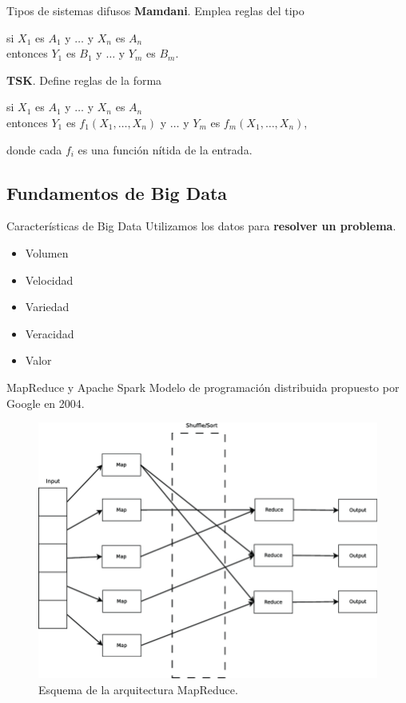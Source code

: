 \documentclass[10pt, spanish]{beamer}
\begin{document}
\begin{frame}{Tipos de sistemas difusos}
\textbf{Mamdani}. Emplea reglas del tipo
  \begin{center}
  si $X_1$ es $A_1$ y $\dots$ y $X_n$ es $A_n$\\
  entonces $Y_1$ es $B_1$ y $\dots$ y $Y_m$ es $B_m$.
\end{center}
\vspace{1em}

\textbf{TSK}. Define reglas de la forma
\begin{center}
  si $X_1$ es $A_1$ y $\dots$ y $X_n$ es $A_n$\\
  entonces $Y_1$ es $f_1(X_1, \dots, X_n)$ y $\dots$ y $Y_m$ es $f_m(X_1, \dots, X_n)$,
\end{center}
    donde cada $f_i$ es una función nítida de la entrada.

\end{frame}

\subsection{Fundamentos de Big Data}

\begin{frame}{Características de Big Data}
  Utilizamos los datos para \textbf{resolver un problema}.

\begin{itemize}
  \item Volumen
  \item Velocidad
  \item Variedad
  \item Veracidad
  \item Valor
\end{itemize}
\end{frame}

\begin{frame}{MapReduce y Apache Spark}
  Modelo de programación distribuida propuesto por Google en 2004.

  \begin{figure}
	\centering
	\includegraphics[width=.6\textwidth]{img/mapreduce}
	\caption{\footnotesize Esquema de la arquitectura MapReduce.}
\end{figure}
\end{frame}
\end{document}
